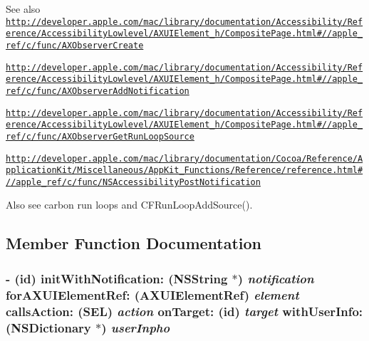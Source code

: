 \begin{DoxySeeAlso}{See also}
\href{http://developer.apple.com/mac/library/documentation/Accessibility/Reference/AccessibilityLowlevel/AXUIElement_h/CompositePage.html#//apple_ref/c/func/AXObserverCreate}{\tt http://developer.apple.com/mac/library/documentation/Accessibility/Reference/AccessibilityLowlevel/AXUIElement\_\-h/CompositePage.html\#//apple\_\-ref/c/func/AXObserverCreate} 

\href{http://developer.apple.com/mac/library/documentation/Accessibility/Reference/AccessibilityLowlevel/AXUIElement_h/CompositePage.html#//apple_ref/c/func/AXObserverAddNotification}{\tt http://developer.apple.com/mac/library/documentation/Accessibility/Reference/AccessibilityLowlevel/AXUIElement\_\-h/CompositePage.html\#//apple\_\-ref/c/func/AXObserverAddNotification} 

\href{http://developer.apple.com/mac/library/documentation/Accessibility/Reference/AccessibilityLowlevel/AXUIElement_h/CompositePage.html#//apple_ref/c/func/AXObserverGetRunLoopSource}{\tt http://developer.apple.com/mac/library/documentation/Accessibility/Reference/AccessibilityLowlevel/AXUIElement\_\-h/CompositePage.html\#//apple\_\-ref/c/func/AXObserverGetRunLoopSource} 

\href{http://developer.apple.com/mac/library/documentation/Cocoa/Reference/ApplicationKit/Miscellaneous/AppKit_Functions/Reference/reference.html#//apple_ref/c/func/NSAccessibilityPostNotification}{\tt http://developer.apple.com/mac/library/documentation/Cocoa/Reference/ApplicationKit/Miscellaneous/AppKit\_\-Functions/Reference/reference.html\#//apple\_\-ref/c/func/NSAccessibilityPostNotification} 

Also see carbon run loops and CFRunLoopAddSource(). 
\end{DoxySeeAlso}


\subsection{Member Function Documentation}
\hypertarget{interface_g_d_accessibility_observer_a38b7e5cbcdd5a9d4ff0e61fef5fede37}{
\subsubsection[{initWithNotification:forAXUIElementRef:callsAction:onTarget:withUserInfo:}]{\setlength{\rightskip}{0pt plus 5cm}-\/ (id) initWithNotification: ({\bf NSString} $\ast$) {\em notification}\/ forAXUIElementRef: (AXUIElementRef) {\em element}\/ callsAction: (SEL) {\em action}\/ onTarget: (id) {\em target}\/ withUserInfo: (NSDictionary $\ast$) {\em userInpho}}}
\label{interface_g_d_accessibility_observer_a38b7e5cbcdd5a9d4ff0e61fef5fede37}


